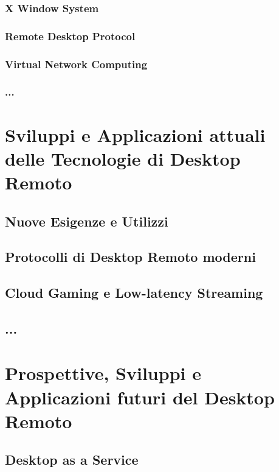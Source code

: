 \documentclass[12pt,a4paper,openright,twoside]{book}
\begin{document}
\subsection{X Window System}

\subsection{Remote Desktop Protocol}

\subsection{Virtual Network Computing}

\subsection{...}

\chapter{Sviluppi e Applicazioni attuali delle Tecnologie di Desktop Remoto}

\section{Nuove Esigenze e Utilizzi}

\section{Protocolli di Desktop Remoto moderni}

\section{Cloud Gaming e Low-latency Streaming}

\section{...}

\chapter{Prospettive, Sviluppi e Applicazioni futuri del Desktop Remoto}

\section{Desktop as a Service}
\end{document}
